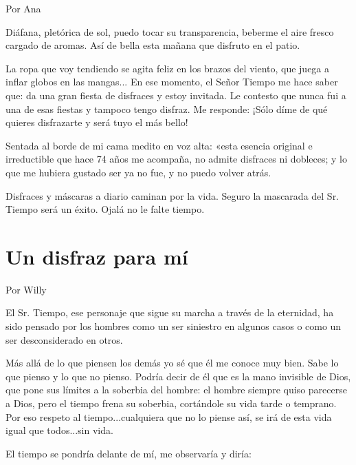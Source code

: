 \documentclass[11pt,twoside,openright,a5paper]{book}
\begin{document}
                                                                                      \begin{flushright}Por Ana\end{flushright}

Diáfana, pletórica de sol, puedo tocar su transparencia, beberme el aire fresco cargado de aromas. Así de bella esta mañana que disfruto en el patio.

La ropa que voy tendiendo se agita feliz en los brazos del viento, que juega a inflar globos en las mangas... En ese momento, el Señor Tiempo me hace saber que: da una gran fiesta de disfraces y estoy invitada. Le contesto que nunca fui a una de esas fiestas y tampoco tengo disfraz. Me responde: ¡Sólo díme de qué quieres disfrazarte y será tuyo el más bello!

Sentada al borde de mi cama medito en voz alta: «esta esencia original e irreductible que hace 74 años me acompaña, no admite disfraces ni dobleces; y lo que me hubiera gustado ser ya no fue, y no puedo volver atrás.

Disfraces y máscaras a diario caminan por la vida. Seguro la mascarada del Sr. Tiempo será un éxito. Ojalá no le falte tiempo.

\section*{Un disfraz para mí}

                                                                                   \begin{flushright}Por Willy\end{flushright}

El Sr. Tiempo, ese personaje que sigue su marcha a través de la eternidad, ha sido pensado por los hombres como un ser siniestro en algunos casos o como un ser desconsiderado en otros. 

Más allá de lo que piensen los demás yo sé que él me conoce muy bien. Sabe lo que pienso y lo que no pienso. Podría decir de él que es la mano invisible de Dios, que pone sus límites a la soberbia del hombre: el hombre siempre quiso parecerse a Dios, pero el tiempo frena su soberbia, cortándole su vida tarde o temprano. Por eso respeto al tiempo...cualquiera que no lo piense así, se irá de esta vida igual que todos...sin vida.

El tiempo se pondría delante de mí, me observaría y diría: 
\end{document}
